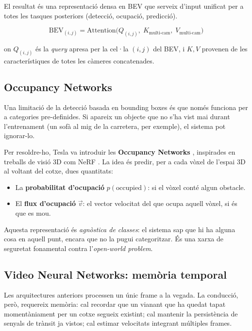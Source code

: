 \documentclass[11pt,a4paper]{article}
\begin{document}
El resultat és una representació densa en BEV que serveix d'input unificat per a totes les tasques posteriors (detecció, ocupació, predicció).

\begin{equation}
\text{BEV}_{(i,j)} = \text{Attention}\big(Q_{(i,j)},\; K_{\text{multi-cam}},\; V_{\text{multi-cam}}\big)
\end{equation}

on $Q_{(i,j)}$ és la \emph{query} apresa per la cel·la $(i,j)$ del BEV, i $K, V$ provenen de les característiques de totes les càmeres concatenades.

\subsection{Occupancy Networks}

Una limitació de la detecció basada en bounding boxes és que només funciona per a categories pre-definides. Si apareix un objecte que no s'ha vist mai durant l'entrenament (un sofà al mig de la carretera, per exemple), el sistema pot ignorar-lo.

Per resoldre-ho, Tesla va introduir les \textbf{Occupancy Networks} \cite{tesla2022}, inspirades en treballs de visió 3D com NeRF \cite{mildenhall2020}. La idea és predir, per a cada vòxel de l'espai 3D al voltant del cotxe, dues quantitats:

\begin{itemize}[leftmargin=*]
    \item La \textbf{probabilitat d'ocupació} $p(\text{occupied})$: si el vòxel conté algun obstacle.
    \item El \textbf{flux d'ocupació} $\vec{v}$: el vector velocitat del que ocupa aquell vòxel, si és que es mou.
\end{itemize}

Aquesta representació és \emph{agnòstica de classes}: el sistema sap que hi ha alguna cosa en aquell punt, encara que no la pugui categoritzar. És una xarxa de seguretat fonamental contra l'\emph{open-world problem}.

\subsection{Video Neural Networks: memòria temporal}

Les arquitectures anteriors processen un únic frame a la vegada. La conducció, però, requereix memòria: cal recordar que un vianant que ha quedat tapat momentàniament per un cotxe segueix existint; cal mantenir la persistència de senyals de trànsit ja vistos; cal estimar velocitats integrant múltiples frames.
\end{document}
